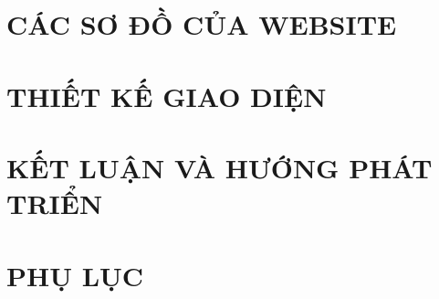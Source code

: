 \documentclass[a4paper,12pt,oneside]{report}
\begin{document}
\chapter{CÁC SƠ ĐỒ CỦA WEBSITE}


\chapter{THIẾT KẾ GIAO DIỆN}


\chapter{KẾT LUẬN VÀ HƯỚNG PHÁT TRIỂN}


\clearpage
{}
{}
\nocite{*}



\clearpage
\appendix
\chapter*{PHỤ LỤC}
{}

\end{document}
